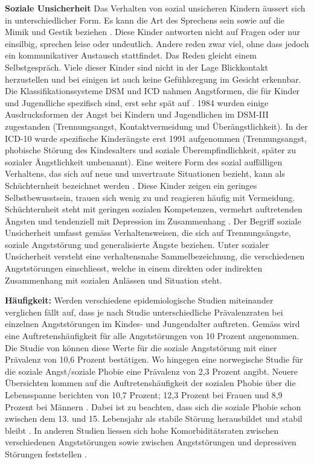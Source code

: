 \textbf{Soziale Unsicherheit}
Das Verhalten von sozial unsicheren Kindern äussert sich in unterschiedlicher Form. Es kann die Art des Sprechens sein sowie auf die Mimik und Gestik beziehen \cite{Petermann:2015}. Diese Kinder antworten nicht auf Fragen oder nur einsilbig, sprechen leise oder undeutlich. Andere reden zwar viel, ohne dass jedoch ein kommunikativer Austausch stattfindet. Das Reden gleicht einem Selbstgespräch. Viele dieser Kinder sind nicht in der Lage Blickkontakt herzustellen und bei einigen ist auch keine Gefühlsregung im Gesicht erkennbar. Die Klassifikationssysteme DSM und ICD nahmen Angstformen, die für Kinder und Jugendliche spezifisch sind, erst sehr spät auf \cite{Petermann:2015}. 1984 wurden einige Ausdrucksformen der Angst bei Kindern und Jugendlichen im DSM-III zugestanden (Trennungsangst, Kontaktvermeidung und Überängstlichkeit). In der ICD-10 wurde spezifische Kinderängste erst 1991 aufgenommen (Trennungsangst, phobische Störung des Kindesalters und soziale Überempfindlichkeit, später zu sozialer Ängstlichkeit umbenannt). Eine weitere Form des sozial auffälligen Verhaltens, das sich auf neue und unvertraute Situationen bezieht, kann als Schüchternheit bezeichnet werden \cite{Petermann:2015b}. Diese Kinder zeigen ein geringes Selbstbewusstsein, trauen sich wenig zu und reagieren häufig mit Vermeidung. Schüchternheit steht mit geringen sozialen Kompetenzen, vermehrt auftretenden Ängsten und tendenziell mit Depression im Zusammenhang \cite{Karevold:2012}. Der Begriff soziale Unsicherheit umfasst gemäss  Verhaltensweisen, die sich auf Trennungsängste, soziale Angststörung und generalisierte Ängste beziehen. Unter sozialer Unsicherheit versteht  eine verhaltensnahe Sammelbezeichnung, die verschiedenen Angststörungen einschliesst, welche in einem direkten oder indirekten Zusammenhang mit sozialen Anlässen und Situation steht. 

\textbf{Häufigkeit:} Werden verschiedene epidemiologische Studien miteinander verglichen fällt auf, dass je nach Studie unterschiedliche Prävalenzraten bei einzelnen Angststörungen im Kindes- und Jungendalter auftreten. Gemäss  wird eine Auftretenshäufigkeit für alle Angststörungen von 10 Prozent angenommen. Die Studie von  können diese Werte für die soziale Angststörung mit einer Prävalenz von 10,6 Prozent bestätigen. Wo hingegen eine norwegische Studie \cite{VanRoy:2009} für die soziale Angst/soziale Phobie eine Prävalenz von 2,3 Prozent angibt. Neuere Übersichten kommen auf die Auftretenshäufigkeit der sozialen Phobie über die Lebensspanne berichten von 10,7 Prozent; 12,3 Prozent bei Frauen und 8,9 Prozent bei Männern \cite{Kessler:2012}. Dabei ist zu beachten, dass sich die soziale Phobie schon zwischen dem 13. und 15. Lebensjahr als stabile Störung herausbildet und stabil bleibt \cite{Petermann:2015}. 
In anderen Studien liessen sich hohe Komorbiditätsraten zwischen verschiedenen Angststörungen \cite{HelbigLang:2009} sowie zwischen Angststörungen und depressiven Störungen feststellen \cite{Beesdo:2007}. 

